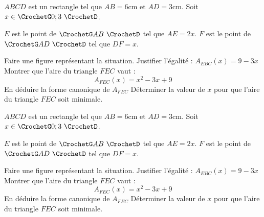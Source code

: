 \vfill
\begin{Activite}
$ABCD$ est un rectangle tel que $AB=6$cm et $AD=3$cm. Soit $x\in \CrochetG 0;3\,\,\CrochetD$. \\[0.4em]

\begin{MultiColonnes}{2}
\tcbitem $E$ est le point de $\CrochetG AB\,\,\CrochetD$ tel que $AE=2x$.
\tcbitem $F$ est le point de $\CrochetG AD\,\,\CrochetD$ tel que $DF=x$.
\end{MultiColonnes}

\begin{tcbenumerate}[2]
    \tcbitem Faire une figure représentant la situation.
    \tcbitem Justifier l'égalité : $A_{EBC}(x)=9-3x$
    \tcbitem Montrer que l'aire du triangle $FEC$ vaut : $$A_{FEC}(x)=x^2-3x+9$$
    \tcbitem En déduire la forme canonique de $A_{FEC}$
    \tcbitem[raster multicolumn=2] Déterminer la valeur de $x$ pour que l'aire du triangle $FEC$ soit minimale.
\end{tcbenumerate}
\end{Activite}

\vfill

\begin{Activite}
$ABCD$ est un rectangle tel que $AB=6$cm et $AD=3$cm. Soit $x\in \CrochetG 0;3\,\,\CrochetD$. \\[0.4em]

\begin{MultiColonnes}{2}
\tcbitem $E$ est le point de $\CrochetG AB\,\,\CrochetD$ tel que $AE=2x$.
\tcbitem $F$ est le point de $\CrochetG AD\,\,\CrochetD$ tel que $DF=x$.
\end{MultiColonnes}

\begin{tcbenumerate}[2]
    \tcbitem Faire une figure représentant la situation.
    \tcbitem Justifier l'égalité : $A_{EBC}(x)=9-3x$
    \tcbitem Montrer que l'aire du triangle $FEC$ vaut : $$A_{FEC}(x)=x^2-3x+9$$
    \tcbitem En déduire la forme canonique de $A_{FEC}$
    \tcbitem[raster multicolumn=2] Déterminer la valeur de $x$ pour que l'aire du triangle $FEC$ soit minimale.
\end{tcbenumerate}
\end{Activite}

